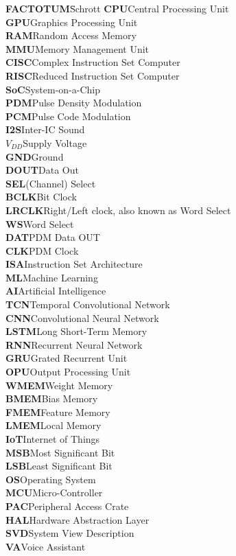 \documentclass[oneside,11pt,a4paper,twoside]{scrreprt}
\begin{document}
\begin{tabbing}
\textbf{FACTOTUM}\hspace{1cm}\=Schrott\kill
\textbf{CPU}\>Central Processing Unit
\\
\textbf{GPU}\>Graphics Processing Unit
\\
\textbf{RAM}\>Random Access Memory
\\
\textbf{MMU}\>Memory Management Unit
\\
\textbf{CISC}\>Complex Instruction Set Computer
\\
\textbf{RISC}\>Reduced Instruction Set Computer
\\
\textbf{SoC}\>System-on-a-Chip
\\
\textbf{PDM}\>Pulse Density Modulation
\\
\textbf{PCM}\>Pulse Code Modulation
\\
\textbf{I2S}\>Inter-IC Sound
\\
\textbf{$V_{DD}$}\>Supply Voltage
\\
\textbf{GND}\>Ground
\\
\textbf{DOUT}\>Data Out
\\
\textbf{SEL}\>(Channel) Select
\\
\textbf{BCLK}\>Bit Clock
\\
\textbf{LRCLK}\>Right/Left clock, also known as Word Select
\\
\textbf{WS}\>Word Select
\\
\textbf{DAT}\>PDM Data OUT
\\
\textbf{CLK}\>PDM Clock
\\
\textbf{ISA}\>Instruction Set Architecture
\\
\textbf{ML}\>Machine Learning
\\
\textbf{AI}\>Artificial Intelligence
\\
\textbf{TCN}\>Temporal Convolutional Network
\\
\textbf{CNN}\>Convolutional Neural Network
\\
\textbf{LSTM}\>Long Short-Term Memory
\\
\textbf{RNN}\>Recurrent Neural Network
\\
\textbf{GRU}\>Grated Recurrent Unit
\\
\textbf{OPU}\>Output Processing Unit
\\
\textbf{WMEM}\>Weight Memory
\\
\textbf{BMEM}\>Bias Memory
\\
\textbf{FMEM}\>Feature Memory
\\
\textbf{LMEM}\>Local Memory
\\
\textbf{IoT}\>Internet of Things
\\
\textbf{MSB}\>Most Significant Bit
\\
\textbf{LSB}\>Least Significant Bit
\\
\textbf{OS}\>Operating System
\\
\textbf{MCU}\>Micro-Controller
\\
\textbf{PAC}\>Peripheral Access Crate
\\
\textbf{HAL}\>Hardware Abstraction Layer
\\
\textbf{SVD}\>System View Description
\\
\textbf{VA}\>Voice Assistant
\end{tabbing}
\cleardoublepage
\end{document}
